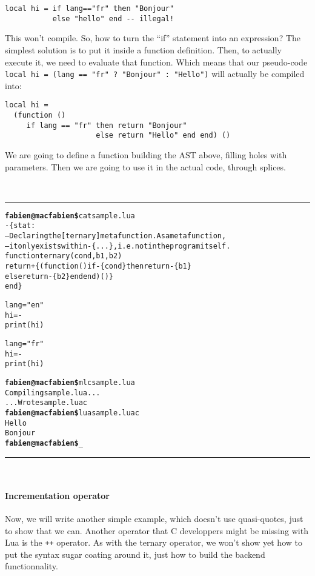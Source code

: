 \begin{verbatim}
local hi = if lang=="fr" then "Bonjour" 
           else "hello" end -- illegal!
\end{verbatim}

This won't compile. So, how to turn the ``if'' statement into an
expression? The simplest solution is to put it inside a function
definition. Then, to actually execute it, we need to evaluate that
function. Which means that our pseudo-code
\verb|local hi = (lang == "fr" ? "Bonjour" : "Hello")| will 
actually be compiled into:

\begin{verbatim}
local hi = 
  (function ()
     if lang == "fr" then return "Bonjour"
                     else return "Hello" end end) ()
\end{verbatim}

We are going to define a function building the AST above, filling
holes with parameters. Then we are going to use it in the actual code,
through splices.

~\\\hrule
\begin{alltt}
{\bf{}fabien@macfabien\$} cat sample.lua
-\{stat:
  -- Declaring the [ternary] metafunction. As a metafunction,
  -- it only exists within -\{...\}, i.e. not in the program itself.
  function ternary (cond, b1, b2)
     return +\{ (function() if -\{cond\} then return -\{b1\} 
                           else return -\{b2\} end end)() \}
  end \}

lang = "en"
hi = -
print (hi)

lang = "fr"
hi = -
print (hi)

{\bf{}fabien@macfabien\$} mlc sample.lua
Compiling sample.lua...
...Wrote sample.luac
{\bf{}fabien@macfabien\$} lua sample.luac
Hello
Bonjour
{\bf{}fabien@macfabien\$} _
\end{alltt}
\hrule~\\

\paragraph{Incrementation operator}
Now, we will write another simple example, which doesn't use
quasi-quotes, just to show that we can. Another operator that C
developpers might be missing with Lua is the \verb|++| operator. As
with the ternary operator, we won't show yet how to put the syntax
sugar coating around it, just how to build the backend functionnality.

